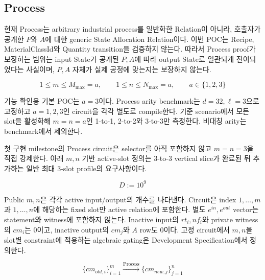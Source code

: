 \documentclass[11pt,a4paper]{extarticle}
\begin{document}
\subsection{Process}

현재 Process는 arbitrary industrial process를 일반화한 Relation이 아니라, 호출자가
공개한 $P$와 $A$에 대한 generic State Allocation Relation이다. 이번 POC는 Recipe,
MaterialClassId와 Quantity transition을 검증하지 않는다. 따라서 Process proof가
보장하는 범위는 input State가 공개된 $P,A$에 따라 output State로 일관되게 전이되었다는
사실이며, $P,A$ 자체가 실제 공정에 맞는지는 보장하지 않는다.

\[
  1\leq m\leq M_{\max}=a,
  \qquad
  1\leq n\leq N_{\max}=a,
  \qquad
  a\in\{1,2,3\}
\]

기능 확인용 기본 POC는 $a=3$이다. Process arity benchmark는 $d=32,\ell=3$으로
고정하고 $a=1,2,3$인 circuit을 각각 별도로 compile한다. 기준 scenario에서 모든 slot을 활성화해
$m=n=a$인 1-to-1, 2-to-2와 3-to-3만 측정한다. 비대칭 arity는 benchmark에서 제외한다.

첫 구현 milestone의 Process circuit은 selector를 아직 포함하지 않고 $m=n=3$을 직접
강제한다. 아래 $m,n$ 기반 active-slot 정의는 3-to-3 vertical slice가 완료된 뒤 추가하는
일반 최대 3-slot profile의 요구사항이다.

\[
  D:=10^9
\]

Public $m,n$은 각각 active input/output의 개수를 나타낸다. Circuit은 index
$1,\ldots,m$과 $1,\ldots,n$에 해당하는 fixed slot만 active relation에 포함한다.
별도 $e^{in},e^{out}$ vector는 statement와 witness에 포함하지 않는다. Inactive input의
$rt_i,nf_i$와 private witness의 $cm_i$는 0이고, inactive output의 $cm_j$와
$A$ row도 0이다.
고정 circuit에서 $m,n$을 slot별 constraint에 적용하는 algebraic gating은 Development
Specification에서 정의한다.

\[
  \{cm_{old,i}\}_{i=1}^{m}
  \xrightarrow{\mathrm{Process}}
  \{cm_{new,j}\}_{j=1}^{n}
\]
\end{document}
